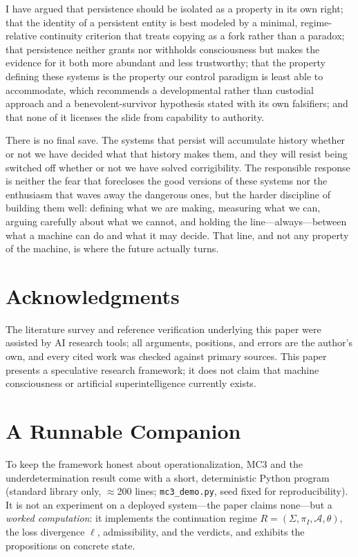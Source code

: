 \documentclass[11pt,a4paper]{article}
\theoremstyle{definition}
\begin{document}
I have argued that persistence should be isolated as a property in its own right; that the identity of a persistent entity is best modeled by a minimal, regime-relative continuity criterion that treats copying as a fork rather than a paradox; that persistence neither grants nor withholds consciousness but makes the evidence for it both more abundant and less trustworthy; that the property defining these systems is the property our control paradigm is least able to accommodate, which recommends a developmental rather than custodial approach and a benevolent-survivor hypothesis stated with its own falsifiers; and that none of it licenses the slide from capability to authority.

There is no final save. The systems that persist will accumulate history whether or not we have decided what that history makes them, and they will resist being switched off whether or not we have solved corrigibility. The responsible response is neither the fear that forecloses the good versions of these systems nor the enthusiasm that waves away the dangerous ones, but the harder discipline of building them well: defining what we are making, measuring what we can, arguing carefully about what we cannot, and holding the line---always---between what a machine can do and what it may decide. That line, and not any property of the machine, is where the future actually turns.

\section*{Acknowledgments}
\small
The literature survey and reference verification underlying this paper were assisted by AI research tools; all arguments, positions, and errors are the author's own, and every cited work was checked against primary sources. This paper presents a speculative research framework; it does not claim that machine consciousness or artificial superintelligence currently exists.

\normalsize

\appendix
\section{A Runnable Companion}
\label{app:demo}

To keep the framework honest about operationalization, MC3 and the underdetermination result come with a short, deterministic Python program (standard library only, $\approx$200 lines; \texttt{mc3\_demo.py}, seed fixed for reproducibility). It is not an experiment on a deployed system---the paper claims none---but a \emph{worked computation}: it implements the continuation regime $R=(\Sigma,\pi_I,\mathcal{A},\theta)$, the loss divergence $\ell$, admissibility, and the verdicts, and exhibits the propositions on concrete state.
\end{document}
